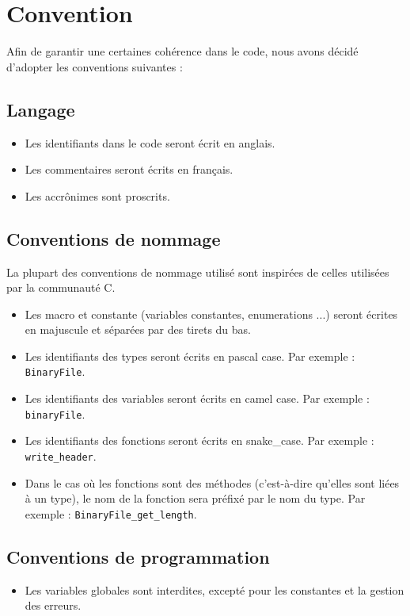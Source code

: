\section{Convention}

Afin de garantir une certaines cohérence dans le code, nous avons décidé d'adopter les conventions suivantes :

\subsection{Langage}

\begin{itemize}
    \item Les identifiants dans le code seront écrit en anglais.
    \item Les commentaires seront écrits en français.
    \item Les accrônimes sont proscrits.
\end{itemize}


\subsection{Conventions de nommage}

La plupart des conventions de nommage utilisé sont inspirées de celles utilisées par la communauté C.

\begin{itemize}
    \item Les macro et constante (variables constantes, enumerations ...) seront écrites en majuscule et séparées par des tirets du bas.
    \item Les identifiants des types seront écrits en pascal case. Par exemple : \texttt{BinaryFile}.
    \item Les identifiants des variables seront écrits en camel case. Par exemple : \texttt{binaryFile}.
    \item Les identifiants des fonctions seront écrits en snake\_case. Par exemple : \texttt{write\_header}.
    \item Dans le cas où les fonctions sont des méthodes (c'est-à-dire qu'elles sont liées à un type), le nom de la fonction sera préfixé par le nom du type. Par exemple : \texttt{BinaryFile\_get\_length}.
\end{itemize}

\subsection{Conventions de programmation}

\begin{itemize}
    \item Les variables globales sont interdites, excepté pour les constantes et la gestion des erreurs.
\end{itemize}